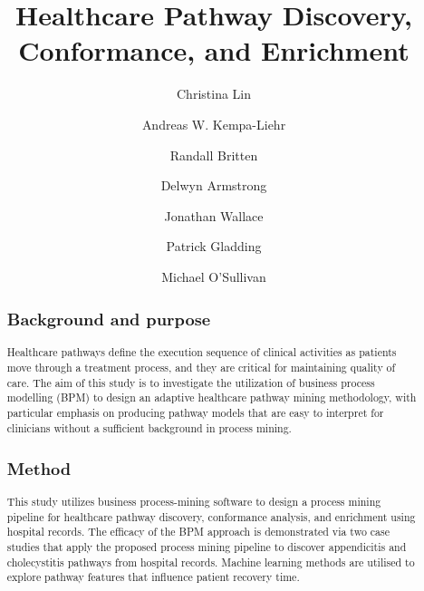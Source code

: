 \documentclass{elsarticle}
\begin{document}
\begin{frontmatter}

\title{Healthcare Pathway Discovery, Conformance, and Enrichment}


\author[mymainaddress]{Christina Lin}
\author[mymainaddress]{Andreas W. Kempa-Liehr}

\author[Orion]{Randall Britten}
\author[Waitemata]{Delwyn Armstrong}
\author[Waitemata]{Jonathan Wallace}
\author[Waitemata]{Patrick Gladding}
\author[mymainaddress]{ Michael O'Sullivan}

\address[mymainaddress]{Department of Engineering Science, The University of Auckland, 70 Symonds St, Grafton, Auckland, New Zealand}
\address[Orion]{Orion Health, 181 Grafton Rd, Grafton, Auckland, New Zealand}
\address[Waitemata]{Waitemata District Health Board, 124 Shakespeare Rd, Takapuna, Auckland, New Zealand
}

\begin{abstract}
\subsection*{Background and purpose}
Healthcare pathways define the execution sequence of clinical activities as patients move through a treatment process, and they are critical for maintaining quality of care. The aim of this study is to investigate the utilization of business process modelling (BPM) to design an adaptive healthcare pathway mining methodology, with particular emphasis on producing pathway models that are easy to interpret for clinicians without a sufficient background in process mining.

\subsection*{Method}
This study utilizes business process-mining software to design a process mining pipeline for healthcare pathway discovery, conformance analysis, and enrichment using hospital records. The efficacy of the BPM approach is demonstrated via two case studies that apply the proposed process mining pipeline to discover appendicitis and cholecystitis pathways from hospital records. Machine learning methods are utilised to explore pathway features that influence patient recovery time.


\end{abstract}
\end{frontmatter}
\end{document}
